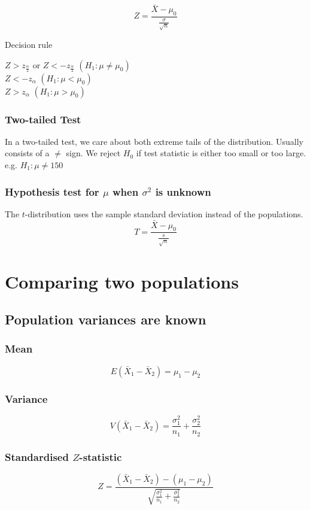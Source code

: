 \documentclass{article}
\begin{document}
$$
Z = \frac{\bar{X} - \mu_0}{\frac{\sigma}{\sqrt{n}}}
$$

Decision rule

$Z > z_{\frac{\alpha}{2}}$ or $Z < -z_{\frac{\alpha}{2}}$ $(H_1 : \mu \neq \mu_0)$
\\

$Z < -z_{\alpha}$ $(H_1 : \mu < \mu_0)$
\\

$Z > z_{\alpha}$ $(H_1 : \mu > \mu_0)$



\subsubsection{Two-tailed Test}
In a two-tailed test, we care about both extreme tails of the distribution. Usually consists of a $\neq$ sign. We reject $H_0$ if test statistic is either too small or too large.
e.g. $ H_1 : \mu \neq 150$

\subsubsection{Hypothesis test for $\mu$ when $\sigma^2$ is unknown}
The $t$-distribution uses the sample standard deviation instead of the populations.
$$
T = \frac{\bar{X} - \mu_0}{\frac{s}{\sqrt{n}}}
$$


\section{Comparing two populations}

\subsection{Population variances are known}

\subsubsection{Mean}
$$
E(\bar{X}_1 - \bar{X}_2) = \mu_1 - \mu_2
$$

\subsubsection{Variance}
$$
V(\bar{X}_1 - \bar{X}_2) = \frac{\sigma^2_1}{n_1} + \frac{\sigma^2_2}{n_2}
$$

\subsubsection{Standardised $Z$-statistic}
$$
Z = \frac{(\bar{X}_1 - \bar{X}_2) - (\mu_1 - \mu_2)}{\sqrt{\frac{\sigma^2_1}{n_1}+\frac{\sigma^2_2}{n_2}}}
$$
\\
\end{document}
